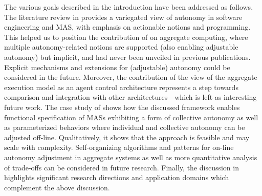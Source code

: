 \documentclass[jsan,article,accept,moreauthors,pdftex]{Definitions/mdpi}
\newcommand{\revision}[1]{{\color{blue}{#1}}}
\begin{document}
\begin{paracol}{2}
The various goals described in the introduction have been addressed as follows.
%
The literature review in  
 provides a variegated view of autonomy in software engineering and MAS, with emphasis on actionable notions and programming.
%
This helped us to position the contribution of  on aggregate computing, where multiple autonomy-related notions 
are supported (also enabling adjustable autonomy) but implicit, and had never been unveiled in previous publications.
%
Explicit mechanisms and extensions for (adjustable) autonomy could be considered in the future.
%
Moreover, the contribution of the view of the aggregate execution model as an agent control architecture represents a step towards comparison and integration with other architectures---which is left as interesting future work.
%
The case study of  shows how the discussed framework
 enables functional specification of 
 MASs exhibiting a form of collective autonomy
 as well as parameterized behaviors
 where individual and collective autonomy 
 can be adjusted off-line.
%
Qualitatively, it shows that the approach is feasible
 and may scale with complexity.
%
Self-organizing algorithms and patterns for on-line autonomy adjustment
 in aggregate systems 
 as well as more quantitative analysis of trade-offs
 can be considered in future research.
%
Finally, the discussion in 
 highlights significant research directions
 and application domains
 which complement the above discussion.



\end{paracol}
\end{document}
